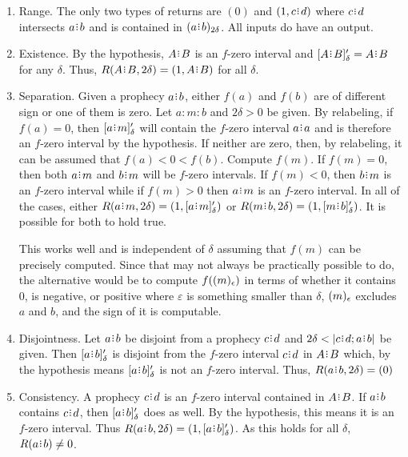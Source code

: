 \documentclass[12pt]{article}
\begin{document}
\begin{enumerate}
\item Range. The only two types of returns are $(0)$ and $(1, c \rint d)$ where $c \rint d$ intersects $a \rint b$ and is contained in $\halo[2 \delta]{a \rint b}$. All inputs do have an output. 

\item Existence. By the hypothesis, $A \rint B$ is an $f$-zero interval and $\clhalo[\delta]{A \rint B}' = A \rint B$ for any $\delta$. Thus, $R(A \rint B, 2\delta) = (1, A \rint B)$ for all $\delta$. 

\item Separation. Given a prophecy $a \rint b$, either $f(a)$ and $f(b)$ are of different sign or one of them is zero. Let $a:m:b$ and $2\delta > 0$ be given. By relabeling, if $f(a) =0$, then $\clhalo{a\rint m}'$ will contain the $f$-zero interval $a\rint a$ and is therefore an $f$-zero interval by the hypothesis. If neither are zero, then, by relabeling, it can be assumed that  $f(a) < 0 < f(b)$. Compute $f(m)$. If $f(m) = 0$, then both $a\rint m$ and $b\rint m$ will be $f$-zero intervals. If $f(m) < 0$, then $b\rint m$ is an $f$-zero interval while if $f(m) > 0$ then $a\rint m$ is an $f$-zero interval. In all of the cases, either $R(a\rint m, 2\delta) = (1, \clhalo{a \rint m}')$ or $R(m\rint b, 2\delta) = (1, \clhalo{m \rint b}')$. It is possible for both to hold true.

This works well and is independent of $\delta$ assuming that $f(m)$ can be precisely computed. Since that may not always be practically possible to do, the alternative would be to compute $f(\halo[\epsilon]{m})$ in terms of whether it contains $0$, is negative, or positive where $\varepsilon$ is something smaller than $\delta$, $\halo[\epsilon]{m}$ excludes $a$ and $b$, and the sign of it is computable.

\item Disjointness. Let $a \rint b$ be disjoint from a prophecy $c\rint d$ and $2 \delta < |c\rint d; a\rint b|$ be given. Then $\clhalo[\delta]{a \rint b}'$ is disjoint from the $f$-zero interval $c\rint d$ in $A\rint B$ which, by the hypothesis means $\clhalo[\delta]{a \rint b}'$ is not an $f$-zero interval. Thus, $R(a\rint b, 2\delta) = (0)$

\item Consistency. A prophecy $c\rint d$ is an $f$-zero interval contained in $A \rint B$. If $a\rint b$ contains $c\rint d$, then $\clhalo{a\rint b}'$ does as well. By the hypothesis, this means it is an $f$-zero interval. Thus $R(a\rint b, 2\delta) = (1, \clhalo{a\rint b}')$. As this holds for all $\delta$, $R(a\rint b) \neq 0$.


\end{enumerate}
\end{document}
